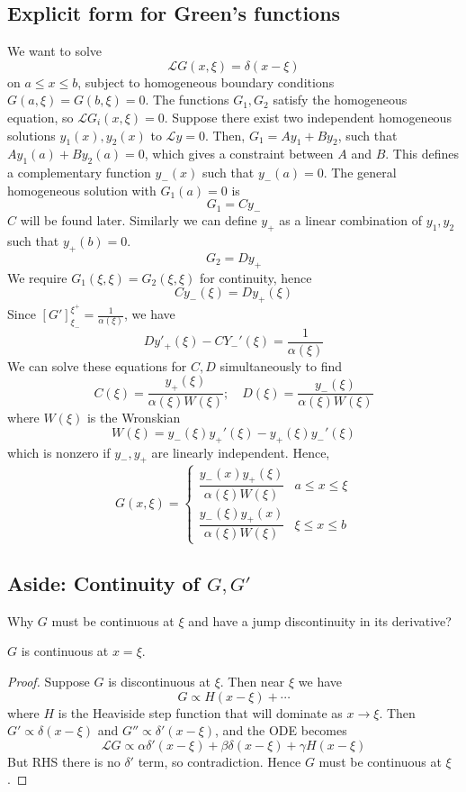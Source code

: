 \documentclass[a4paper]{article}
\begin{document}
\subsection{Explicit form for Green's functions}
We want to solve
\[
	\mathcal L G(x,\xi) = \delta(x-\xi)
\]
on \( a \leq x \leq b \), subject to homogeneous boundary conditions \( G(a,\xi) = G(b,\xi) = 0 \).
The functions \( G_1, G_2 \) satisfy the homogeneous equation, so \( \mathcal L G_i(x,\xi) = 0 \).
Suppose there exist two independent homogeneous solutions \( y_1(x), y_2(x) \) to \( \mathcal L y = 0 \).
Then, \( G_1 = A y_1 + B y_2 \), such that \( A y_1(a) + B y_2(a) = 0 \), which gives a constraint between \( A \) and \( B \).
This defines a complementary function \( y_-(x) \) such that \( y_-(a) = 0 \).
The general homogeneous solution with \( G_1(a) = 0 \) is
\[
	G_1 = C y_-
\]
\( C \) will be found later.
Similarly we can define \( y_+ \) as a linear combination of \( y_1, y_2 \) such that \( y_+(b) = 0 \).
\[
	G_2 = D y_+
\]
We require \( G_1(\xi, \xi) = G_2(\xi, \xi) \) for continuity, hence
\[
	C y_-(\xi) = D y_+(\xi)
\]
Since \( [G']_{\xi_-}^{\xi^+} = \frac{1}{\alpha(\xi)} \), we have
\[
	Dy'_+(\xi) - C Y_-'(\xi) = \frac{1}{\alpha(\xi)}
\]
We can solve these equations for \( C, D \) simultaneously to find
\[
	C(\xi) = \frac{y_+(\xi)}{\alpha(\xi)W(\xi)};\quad D(\xi) = \frac{y_-(\xi)}{\alpha(\xi)W(\xi)}
\]
where \( W(\xi) \) is the Wronskian
\[
	W(\xi) = y_-(\xi) y_+'(\xi) - y_+(\xi) y_-'(\xi)
\]
which is nonzero if \( y_-, y_+ \) are linearly independent.
Hence,
\[
	G(x,\xi) = \begin{cases}
		\dfrac{y_-(x) y_+(\xi)}{\alpha(\xi)W(\xi)} & a \leq x \leq \xi \\[1em]
		\dfrac{y_-(\xi) y_+(x)}{\alpha(\xi)W(\xi)} & \xi \leq x \leq b
	\end{cases}
\]

\subsection{Aside: Continuity of $G,G'$}
Why $G$ must be continuous at $\xi$ and have a jump discontinuity in its derivative?
\begin{proposition}
    $G$ is continuous at $x=\xi$. 
\end{proposition}
\begin{proof}
    Suppose $G$ is discontinuous at $\xi$. Then near $\xi$ we have 
    \[
        G \propto H(x-\xi) + \cdots 
    \]
    where $H$ is the Heaviside step function that will dominate as $x\to \xi$. Then $ G' \propto \delta(x-\xi) $ and $ G'' \propto \delta'(x-\xi) $, and the ODE becomes 
    \[
        \mathcal{L} G \propto \alpha \delta'(x-\xi) + \beta \delta(x-\xi) + \gamma H(x-\xi)
    \]
    But RHS there is no $ \delta' $ term, so contradiction. Hence $G$ must be continuous at $\xi$. 
\end{proof}
\end{document}

